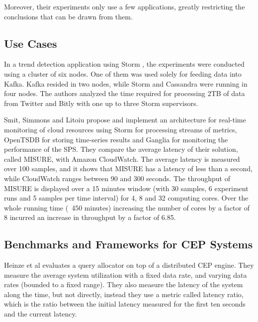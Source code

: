 \documentclass[ppgc,diss,english]{iiufrgs}
\begin{document}
Moreover, their experiments only use a few applications, greatly restricting the conclusions that can be drawn from them.


\subsection{Use Cases}

In a trend detection application using Storm \cite{chardonnens2013big}, the experiments were conducted using a cluster of six nodes. One of them was used solely for feeding data into Kafka. Kafka resided in two nodes, while Storm and Cassandra were running in four nodes. The authors analyzed the time required for processing 2TB of data from Twitter and Bitly with one up to three Storm supervisors.

Smit, Simmons and Litoiu \cite{smit2013distributed} propose and implement an architecture for real-time monitoring of cloud resources using Storm for processing streams of metrics, OpenTSDB for storing time-series results and Ganglia for monitoring the performance of the SPS. They compare the average latency of their solution, called MISURE, with Amazon CloudWatch. The average latency is measured over 100 samples, and it shows that MISURE has a latency of less than a second, while CloudWatch ranges between 90 and 300 seconds. The throughput of MISURE is displayed over a 15 minutes window (with 30 samples, 6 experiment runs and 5 samples per time interval) for 4, 8 and 32 computing cores. Over the whole running time (~450 minutes) increasing the number of cores by a factor of 8 incurred an increase in throughput by a factor of 6.85.


\subsection{Benchmarks and Frameworks for CEP Systems}

Heinze et al \cite{heinzeelastic} evaluates a query allocator on top of a distributed CEP engine. They measure the average system utilization with a fixed data rate, and varying data rates (bounded to a fixed range). They also measure the latency of the system along the time, but not directly, instead they use a metric called latency ratio, which is the ratio between the initial latency measured for the first ten seconds and the current latency.
\end{document}
